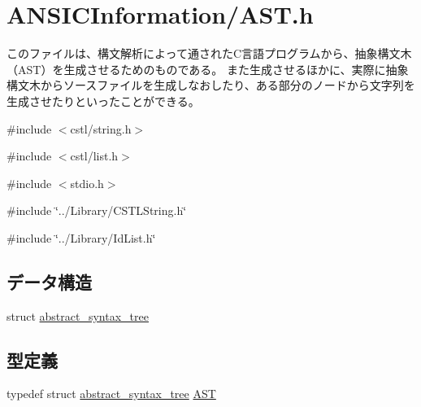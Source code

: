 \section{ANSICInformation/AST.h}
\label{AST_8h}


このファイルは、構文解析によって通されたC言語プログラムから、抽象構文木（AST）を生成させるためのものである。 また生成させるほかに、実際に抽象構文木からソースファイルを生成しなおしたり、ある部分のノードから文字列を生成させたりといったことができる。  


{\ttfamily \#include $<$cstl/string.h$>$}\par
{\ttfamily \#include $<$cstl/list.h$>$}\par
{\ttfamily \#include $<$stdio.h$>$}\par
{\ttfamily \#include \char`\"{}../Library/CSTLString.h\char`\"{}}\par
{\ttfamily \#include \char`\"{}../Library/IdList.h\char`\"{}}\par
\subsection*{データ構造}
\begin{DoxyCompactItemize}
\item 
struct \hyperlink{structabstract__syntax__tree}{abstract\_\-syntax\_\-tree}
\end{DoxyCompactItemize}
\subsection*{型定義}
\begin{DoxyCompactItemize}
\item 
typedef struct \hyperlink{structabstract__syntax__tree}{abstract\_\-syntax\_\-tree} \hyperlink{AST_8h_a33c4b549d3cbe5707e6529c36050be6a}{AST}
\end{DoxyCompactItemize}
